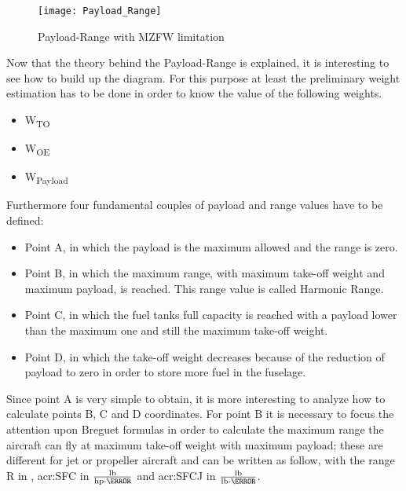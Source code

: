 \bigskip
\begin{figure}[b]
\centering
\texttt{[image: Payload\_Range]}
\caption{Payload-Range with MZFW limitation}
\label{fig:Figure2}
\end{figure}

\bigskip
\noindent
Now that the theory behind the Payload-Range is explained, it is interesting to see how to build up the diagram. For this purpose at least the preliminary weight estimation has to be done in order to know the value of the following weights.
%
\begin{itemize}
\item W\textsubscript{TO}
\item W\textsubscript{OE}
\item W\textsubscript{Payload}
\end{itemize}
%
\noindent 
Furthermore four fundamental couples of payload and range values have to be defined:
%
\begin{itemize}
\item Point A, in which the payload is the maximum allowed and the range is zero.
\item Point B, in which the maximum range, with maximum take-off weight and maximum payload, is reached. This range value is called Harmonic Range.
\item Point C, in which the fuel tanks full capacity is reached with a payload lower than the maximum one and still the maximum take-off weight.
\item Point D, in which the take-off weight decreases because of the reduction of payload to zero in order to store more fuel in the fuselage.
\end{itemize}
%
\noindent
Since point A is very simple to obtain, it is more interesting to analyze how to calculate points B, C and D coordinates.
%
For point B it is necessary to focus the attention upon Breguet formulas in order to calculate the maximum range the aircraft can fly at maximum take-off weight with maximum payload; these are different for jet or propeller aircraft and can be written as follow, with the range R in \si{}{\km}, \gls{acr:SFC} in $\frac{\si{lb}}{\si{hp}\cdot\hour}$ and \gls{acr:SFCJ} in $\frac{\si{lb}}{\si{lb}\cdot\hour}$.
%
